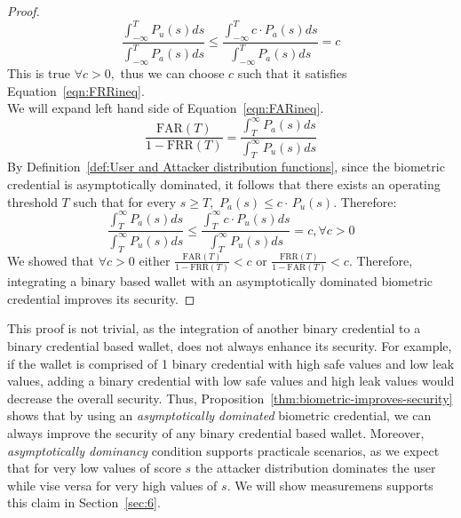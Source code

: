 \documentclass[sigconf]{acmart}
\theoremstyle{definition}
\begin{document}
\begin{proof}
\[
\frac{\int_{-\infty}^{T} P_u(s) ds}{\int_{-\infty}^{T} P_a(s) ds} \le \frac{\int_{-\infty}^{T} c \cdot P_a(s) ds}{\int_{-\infty}^{T} P_a(s) ds} = c
\]
This is true $\forall c > 0,$ thus we can choose $c$ such that it satisfies Equation~\ref{eqn:FRRineq}.\\
We will expand left hand side of Equation~\ref{eqn:FARineq}. 
\[
\frac{\mathrm{FAR}(T)}{1-\mathrm{FRR}(T)} = \frac{\int_{T}^{\infty} P_a(s) ds}{\int_{T}^{\infty} P_u(s) ds}
\]
By Definition~\ref{def:User and Attacker distribution functions}, since the biometric credential is asymptotically dominated, it follows that there exists an operating threshold $T$ such that for every $s \ge T,$ $P_a(s) \le c\cdot\,P_u(s)$. Therefore: 
\[
\frac{\int_{T}^{\infty} P_a(s) ds}{\int_{T}^{\infty} P_u(s) ds} \le \frac{\int_{T}^{\infty} c \cdot P_u(s) ds}{\int_{T}^{\infty} P_u(s) ds} = c, \forall c > 0
\]
We showed that $\forall c>0$  either $\frac{\mathrm{FAR}(T)}{1-\mathrm{FRR}(T)} < c$ or $\frac{\mathrm{FRR}(T)}{1-\mathrm{FAR}(T)} < c$. Therefore, integrating a binary based wallet with an asymptotically dominated biometric credential improves its security.
\end{proof}

This proof is not trivial, as the integration of another binary credential to a binary credential based wallet, does not always enhance its security. For example, if the wallet is comprised of 1 binary credential with high safe values and low leak values, adding a binary credential with low safe values and high leak values would decrease the overall security. Thus, Proposition~\ref{thm:biometric-improves-security} shows that by using an \emph{asymptotically dominated} biometric credential, we can always improve the security of any binary credential based wallet.
Moreover, \emph{asymptotically dominancy} condition supports practicale scenarios, as we expect that for very low values of score $s$ the attacker distribution dominates the user while vise versa for very high values of $s$. We will show measuremens supports this claim in Section~\ref{sec:6}.
\end{document}
